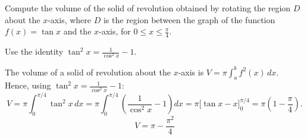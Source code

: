 
\begin{question}
Compute the volume of the solid of revolution obtained by rotating the region $D$ about the $x$-axis, where $D$ is the region between the graph of the function $f(x)=\tan x$ and the $x$-axis, for $0\le x\le\frac\pi4$.
\end{question}

\begin{hint}
Use the identity $\tan^2x=\frac{1}{\cos^2x}-1$.
\end{hint}

\begin{solution}
The volume of a solid of revolution about the $x$-axis is $V=\pi\int_a^b f^2(x)\,dx$. Hence, using $\tan^2x=\frac1{\cos^2x}-1$:
\[ V=\pi\int_0^{\pi/4}\tan^2x\,dx=\pi\int_0^{\pi/4}\left(\frac1{\cos^2x}-1\right)dx=\pi\Big[\tan x-x\Big]_0^{\pi/4}=\pi\left(1-\frac\pi4\right). \]
\[ \boxed{V=\pi-\frac{\pi^2}{4}} \]
\end{solution}
